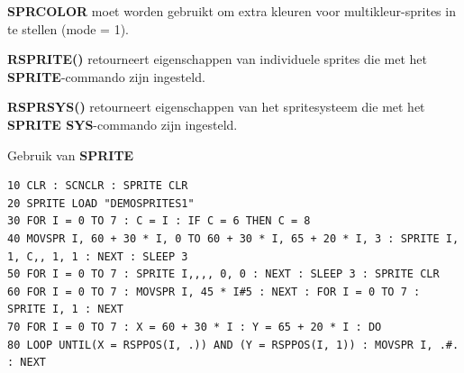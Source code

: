 \begin{description}[leftmargin=2cm,style=nextline]
\item [Opmerkingen:]  {\bf SPRCOLOR} moet worden gebruikt om extra kleuren voor multikleur-sprites in te stellen (mode = 1).

                  {\bf RSPRITE()} retourneert eigenschappen van individuele sprites die met het {\bf SPRITE}-commando zijn ingesteld.

                  {\bf RSPRSYS()} retourneert eigenschappen van het spritesysteem die met het {\bf SPRITE SYS}-commando zijn ingesteld.

\item [Voorbeeld:]  Gebruik van {\bf SPRITE}

\begin{tcolorbox}[colback=black,coltext=white]
\verbatimfont{\codefont}
\begin{verbatim}
10 CLR : SCNCLR : SPRITE CLR
20 SPRITE LOAD "DEMOSPRITES1"
30 FOR I = 0 TO 7 : C = I : IF C = 6 THEN C = 8
40 MOVSPR I, 60 + 30 * I, 0 TO 60 + 30 * I, 65 + 20 * I, 3 : SPRITE I, 1, C,, 1, 1 : NEXT : SLEEP 3
50 FOR I = 0 TO 7 : SPRITE I,,,, 0, 0 : NEXT : SLEEP 3 : SPRITE CLR
60 FOR I = 0 TO 7 : MOVSPR I, 45 * I#5 : NEXT : FOR I = 0 TO 7 : SPRITE I, 1 : NEXT
70 FOR I = 0 TO 7 : X = 60 + 30 * I : Y = 65 + 20 * I : DO
80 LOOP UNTIL(X = RSPPOS(I, .)) AND (Y = RSPPOS(I, 1)) : MOVSPR I, .#. : NEXT
\end{verbatim}
\end{tcolorbox}
\end{description}


\newpage
